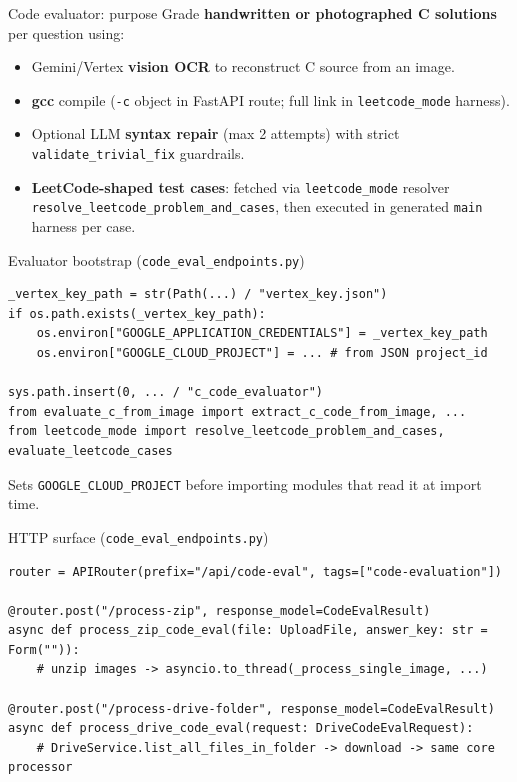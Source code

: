 \documentclass[aspectratio=169]{beamer}
\begin{document}
\begin{frame}{Code evaluator: purpose}
  \small
  Grade \textbf{handwritten or photographed C solutions} per question using:
  \begin{itemize}
    \item Gemini/Vertex \textbf{vision OCR} to reconstruct C source from an image.
    \item \textbf{gcc} compile (\texttt{-c} object in FastAPI route; full link in \texttt{leetcode\_mode} harness).
    \item Optional LLM \textbf{syntax repair} (max 2 attempts) with strict \texttt{validate\_trivial\_fix} guardrails.
    \item \textbf{LeetCode-shaped test cases}: fetched via \texttt{leetcode\_mode} resolver \texttt{resolve\_leetcode\_problem\_and\_cases}, then executed in generated \texttt{main} harness per case.
  \end{itemize}
\end{frame}

\begin{frame}[fragile]{Evaluator bootstrap (\texttt{code\_eval\_endpoints.py})}
\begin{lstlisting}[style=py]
_vertex_key_path = str(Path(...) / "vertex_key.json")
if os.path.exists(_vertex_key_path):
    os.environ["GOOGLE_APPLICATION_CREDENTIALS"] = _vertex_key_path
    os.environ["GOOGLE_CLOUD_PROJECT"] = ... # from JSON project_id

sys.path.insert(0, ... / "c_code_evaluator")
from evaluate_c_from_image import extract_c_code_from_image, ...
from leetcode_mode import resolve_leetcode_problem_and_cases, evaluate_leetcode_cases
\end{lstlisting}
\vfill
\tiny Sets \texttt{GOOGLE\_CLOUD\_PROJECT} before importing modules that read it at import time.
\end{frame}

\begin{frame}[fragile]{HTTP surface (\texttt{code\_eval\_endpoints.py})}
\begin{lstlisting}[style=py]
router = APIRouter(prefix="/api/code-eval", tags=["code-evaluation"])

@router.post("/process-zip", response_model=CodeEvalResult)
async def process_zip_code_eval(file: UploadFile, answer_key: str = Form("")):
    # unzip images -> asyncio.to_thread(_process_single_image, ...)

@router.post("/process-drive-folder", response_model=CodeEvalResult)
async def process_drive_code_eval(request: DriveCodeEvalRequest):
    # DriveService.list_all_files_in_folder -> download -> same core processor
\end{lstlisting}
\end{frame}
\end{document}
